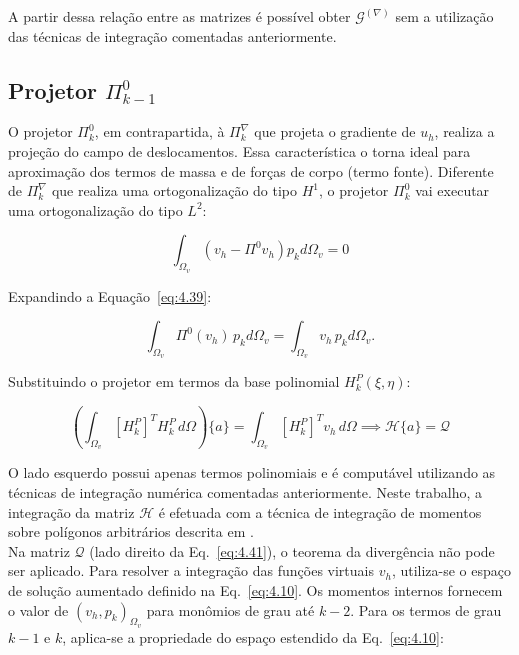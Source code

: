     \indent A partir dessa relação entre as matrizes é possível obter $\mathcal{G}^{(\nabla)}$ sem a utilização das técnicas de integração comentadas anteriormente.


\subsection{Projetor \texorpdfstring{$\Pi_{k-1}^{0}$}{Pi k 0}}
\label{sec:projetor-L2}

    \indent O projetor $\Pi_{k}^0$, em contrapartida, à $\Pi_{k}^\nabla$ que projeta o gradiente de $u_h$, realiza a projeção do campo de deslocamentos. Essa característica o torna ideal para aproximação dos termos de massa e de forças de corpo (termo fonte). Diferente de $\Pi_{k}^\nabla$ que realiza uma ortogonalização do tipo $H^1$, o projetor $\Pi_{k}^0$ vai executar uma ortogonalização do tipo $L^2$:
    
    \begin{equation}
        \int_{\Omega_v} (v_h - \Pi^0 v_h) p_k d\Omega_v = 0 
        \label{eq:4.39}
    \end{equation}

    \indent Expandindo a Equação~\ref{eq:4.39}: 
    
    \begin{equation}
        \int_{\Omega_v} \Pi^0(v_h) \, p_k d\Omega_v = \int_{\Omega_v} v_h \,p_k d\Omega_v .
        \label{eq:4.40}
    \end{equation}

    \indent Substituindo o projetor em termos da base polinomial $H_k^P(\xi, \eta)$: 
    
    \begin{equation}
        \left( \int_{\Omega_v} [H_k^P]^T H_k^P \, d\Omega \right) \{a\} = \int_{\Omega_v} [H_k^P]^T v_h \, d\Omega \implies \mathcal{H} \{a\} = \mathcal{Q} 
        \label{eq:4.41}
    \end{equation}

    \indent O lado esquerdo possui apenas termos polinomiais e é computável utilizando as técnicas de integração numérica comentadas anteriormente. Neste trabalho, a integração da matriz $\mathcal{H}$ é efetuada com a técnica de integração de momentos sobre polígonos arbitrários descrita em \citet{calculationarbitrarymomentspolygonsa}.\\
    \indent Na matriz $\mathcal{Q}$ (lado direito da Eq.~\ref{eq:4.41}), o teorema da divergência não pode ser aplicado. Para resolver a integração das funções virtuais $v_h$, utiliza-se o espaço de solução aumentado definido na Eq.~\ref{eq:4.10}. Os momentos internos fornecem o valor de $(v_h, p_k)_{\Omega_v}$ para monômios de grau até $k-2$. Para os termos de grau $k-1$ e $k$, aplica-se a propriedade do espaço estendido da Eq.~\ref{eq:4.10}: 
    
